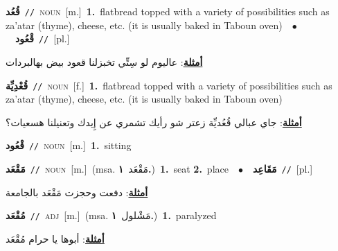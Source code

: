 \documentclass[10pt,a4paper,twoside]{article} %
\begin{document}
\begin{multicols}{2}
{\setlength\topsep{0pt}\textbf{\foreignlanguage{arabic}{قُعُد}}\ {\color{gray}\texttt{//}\color{black}}\ \textsc{noun}\ [m.]\ \textbf{1.}~flatbread topped with a variety of possibilities such as za'atar (thyme), cheese, etc. (it is usually baked in Taboun oven)\ \ $\bullet$\ \ \setlength\topsep{0pt}\textbf{\foreignlanguage{arabic}{قْعُود}}\ {\color{gray}\texttt{//}\color{black}}\ [pl.]\  \begin{flushright}\color{gray}\foreignlanguage{arabic}{\textbf{\underline{\foreignlanguage{arabic}{أمثلة}}}: عاليوم لو سِتِّي تخبزلنا قعود بيض بهالبردات}\end{flushright}\color{black}} \vspace{2mm}

{\setlength\topsep{0pt}\textbf{\foreignlanguage{arabic}{قُعْدِيِّة}}\ {\color{gray}\texttt{//}\color{black}}\ \textsc{noun}\ [f.]\ \textbf{1.}~flatbread topped with a variety of possibilities such as za'atar (thyme), cheese, etc. (it is usually baked in Taboun oven)\  \begin{flushright}\color{gray}\foreignlanguage{arabic}{\textbf{\underline{\foreignlanguage{arabic}{أمثلة}}}: جاي عبالي قُعُديِّة زعتر شو رأيك تشمري عن إِيدك وتعنيلنا هسعيات؟}\end{flushright}\color{black}} \vspace{2mm}

{\setlength\topsep{0pt}\textbf{\foreignlanguage{arabic}{قْعُود}}\ {\color{gray}\texttt{//}\color{black}}\ \textsc{noun}\ [m.]\ \textbf{1.}~sitting\ } \vspace{2mm}

{\setlength\topsep{0pt}\textbf{\foreignlanguage{arabic}{مَقْعَد}}\ {\color{gray}\texttt{//}\color{black}}\ \textsc{noun}\ [m.]\ \color{gray}(msa. \foreignlanguage{arabic}{مَقْعَد}~\foreignlanguage{arabic}{\textbf{١.}})\color{black}\ \textbf{1.}~seat  \textbf{2.}~place\ \ $\bullet$\ \ \setlength\topsep{0pt}\textbf{\foreignlanguage{arabic}{مَقَاعِد}}\ {\color{gray}\texttt{//}\color{black}}\ [pl.]\  \begin{flushright}\color{gray}\foreignlanguage{arabic}{\textbf{\underline{\foreignlanguage{arabic}{أمثلة}}}: دفعت وحجزت مَقْعَد بالجامعة}\end{flushright}\color{black}} \vspace{2mm}

{\setlength\topsep{0pt}\textbf{\foreignlanguage{arabic}{مُقْعَد}}\ {\color{gray}\texttt{//}\color{black}}\ \textsc{adj}\ [m.]\ \color{gray}(msa. \foreignlanguage{arabic}{مَشْلول}~\foreignlanguage{arabic}{\textbf{١.}})\color{black}\ \textbf{1.}~paralyzed\  \begin{flushright}\color{gray}\foreignlanguage{arabic}{\textbf{\underline{\foreignlanguage{arabic}{أمثلة}}}: أبوها يا حرام مُقْعَد}\end{flushright}\color{black}} \vspace{2mm}


\end{multicols}
\end{document}
